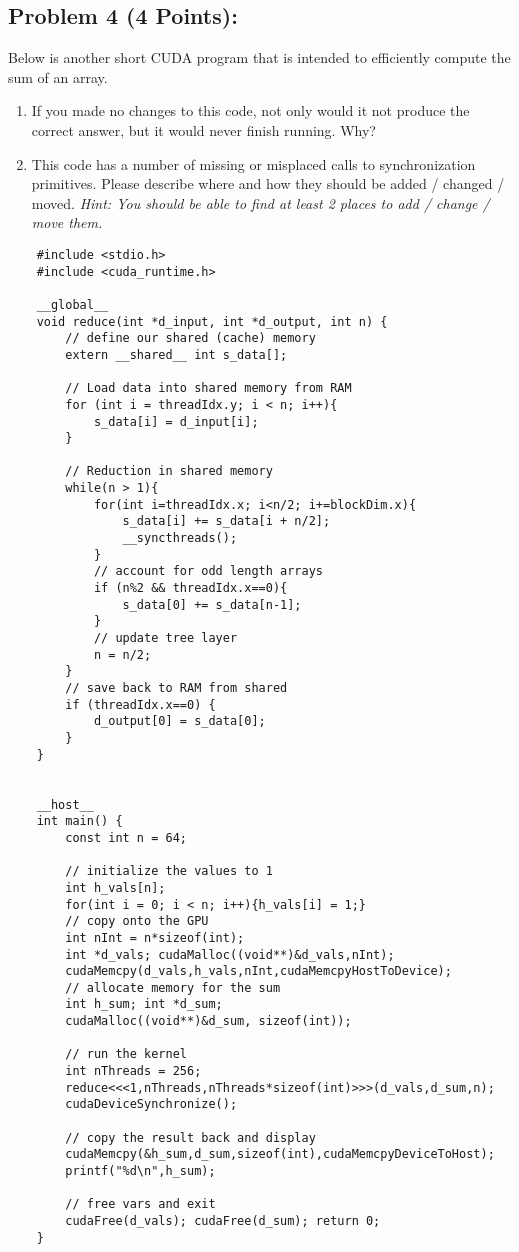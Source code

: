 \documentclass[]{article}
\begin{document}
\subsection*{Problem 4 (4 Points):}
Below is another short CUDA program that is intended to efficiently compute the sum of an array.
\begin{enumerate}[label=(\alph*)]
    \item If you made no changes to this code, not only would it not produce the correct answer, but it would never finish running. Why?
    \item This code has a number of missing or misplaced calls to synchronization primitives. Please describe where and how they should be added / changed / moved. \textit{Hint: You should be able to find at least 2 places to add / change / move them.}
\end{enumerate}

\begin{lstlisting}
    #include <stdio.h>
    #include <cuda_runtime.h>
    
    __global__ 
    void reduce(int *d_input, int *d_output, int n) {
        // define our shared (cache) memory
        extern __shared__ int s_data[];
        
        // Load data into shared memory from RAM
        for (int i = threadIdx.y; i < n; i++){
            s_data[i] = d_input[i];
        }
    
        // Reduction in shared memory
        while(n > 1){
            for(int i=threadIdx.x; i<n/2; i+=blockDim.x){
                s_data[i] += s_data[i + n/2];
                __syncthreads();
            }
            // account for odd length arrays
            if (n%2 && threadIdx.x==0){
                s_data[0] += s_data[n-1];
            } 
            // update tree layer
            n = n/2;
        }
        // save back to RAM from shared
        if (threadIdx.x==0) {
            d_output[0] = s_data[0];
        }
    }


    __host__
    int main() {
        const int n = 64;
    
        // initialize the values to 1
        int h_vals[n];
        for(int i = 0; i < n; i++){h_vals[i] = 1;}
        // copy onto the GPU
        int nInt = n*sizeof(int);
        int *d_vals; cudaMalloc((void**)&d_vals,nInt);
        cudaMemcpy(d_vals,h_vals,nInt,cudaMemcpyHostToDevice);
        // allocate memory for the sum
        int h_sum; int *d_sum; 
        cudaMalloc((void**)&d_sum, sizeof(int));
    
        // run the kernel
        int nThreads = 256;
        reduce<<<1,nThreads,nThreads*sizeof(int)>>>(d_vals,d_sum,n);
        cudaDeviceSynchronize();
        
        // copy the result back and display
        cudaMemcpy(&h_sum,d_sum,sizeof(int),cudaMemcpyDeviceToHost);
        printf("%d\n",h_sum);
    
        // free vars and exit
        cudaFree(d_vals); cudaFree(d_sum); return 0;
    }
\end{lstlisting}
\end{document}
